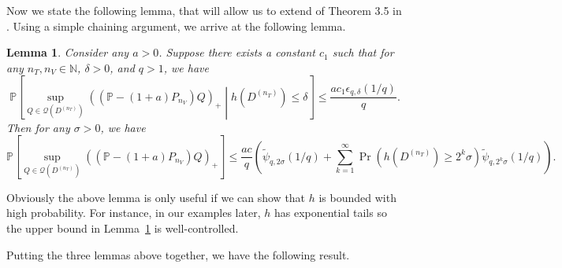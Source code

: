 \documentclass[10pt]{book}
\newtheorem{lemma}{Lemma}
\theoremstyle{definition}
\begin{document}
Now we state the following lemma, that will allow us to extend of Theorem 3.5 in \citet{lecue2012oracle}.
Using a simple chaining argument, we arrive at the following lemma.
\begin{lemma}
	\label{lemma:chain}
Consider any $a>0$.
Suppose there exists a constant $c_{1}$ such that for any $n_{T},n_{V} \in \mathbb{N}$, $\delta>0$,
and $q>1$, we have
\[
\mathbb{P}\left[
\sup_{Q\in\mathcal{Q}(D^{(n_{T})})}\left(\left(\mathbb{P}-(1+a)P_{n_{V}}\right)Q\right)_{+}
\middle | 
h\left(D^{(n_{T})}\right)\le\delta\right]
\le\frac{ac_{1}\epsilon_{q,\delta}(1/q)}{q}.
\]
Then for any $\sigma > 0$, we have
\[
\mathbb{P}\left[\sup_{Q\in\mathcal{Q}(D^{(n_{T})})}\left(\left(\mathbb{P}-(1+a)P_{n_{V}}\right)Q\right)_{+}\right]
\le
\frac{ac}{q}
\left(
\tilde{\psi}_{q,2\sigma}(1/q)
+\sum_{k=1}^{\infty}\Pr\left(h\left(D^{(n_{T})}\right)\ge2^{k}\sigma\right)
\tilde{\psi}_{q,2^{k}\sigma}(1/q)
\right)
.
\]
\end{lemma}
Obviously the above lemma is only useful if we can show that $h$ is bounded with high probability.
For instance, in our examples later, $h$ has exponential tails so the upper bound in Lemma~\ref{lemma:chain} is well-controlled.

Putting the three lemmas above together, we have the following result.
\end{document}
